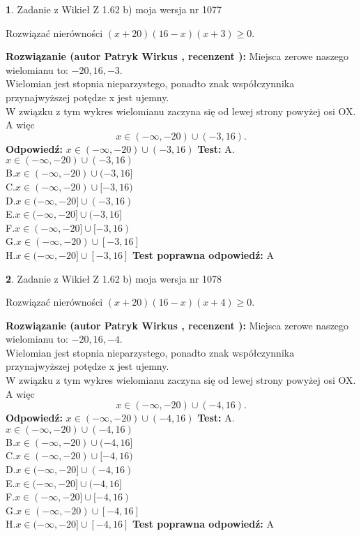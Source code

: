 \documentclass[12pt, a4paper]{article}
\theoremstyle{definition} %
\newtheorem{zad}{}
\newcommand{\zadStart}[1]{\begin{zad}#1\newline}
\newcommand{\zadStop}{\end{zad}}
\newcommand{\rozwStart}[2]{\noindent \textbf{Rozwiązanie (autor #1 , recenzent #2): }\newline}
\newcommand{\rozwStop}{\newline}
\newcommand{\odpStart}{\noindent \textbf{Odpowiedź:}\newline}
\newcommand{\odpStop}{\newline}
\newcommand{\testStart}{\noindent \textbf{Test:}\newline}
\newcommand{\testStop}{\newline}
\newcommand{\kluczStart}{\noindent \textbf{Test poprawna odpowiedź:}\newline}
\newcommand{\kluczStop}{\newline}
\begin{document}
\zadStart{Zadanie z Wikieł Z 1.62 b) moja wersja nr 1077}

Rozwiązać nierówności $(x+20)(16-x)(x+3)\ge0$.
\zadStop
\rozwStart{Patryk Wirkus}{}
Miejsca zerowe naszego wielomianu to: $-20, 16, -3$.\\
Wielomian jest stopnia nieparzystego, ponadto znak współczynnika przy\linebreak najwyższej potędze x jest ujemny.\\ W związku z tym wykres wielomianu zaczyna się od lewej strony powyżej osi OX. A więc $$x \in (-\infty,-20) \cup (-3,16).$$
\rozwStop
\odpStart
$x \in (-\infty,-20) \cup (-3,16)$
\odpStop
\testStart
A.$x \in (-\infty,-20) \cup (-3,16)$\\
B.$x \in (-\infty,-20) \cup (-3,16]$\\
C.$x \in (-\infty,-20) \cup [-3,16)$\\
D.$x \in (-\infty,-20] \cup (-3,16)$\\
E.$x \in (-\infty,-20] \cup (-3,16]$\\
F.$x \in (-\infty,-20] \cup [-3,16)$\\
G.$x \in (-\infty,-20) \cup [-3,16]$\\
H.$x \in (-\infty,-20] \cup [-3,16]$
\testStop
\kluczStart
A
\kluczStop



\zadStart{Zadanie z Wikieł Z 1.62 b) moja wersja nr 1078}

Rozwiązać nierówności $(x+20)(16-x)(x+4)\ge0$.
\zadStop
\rozwStart{Patryk Wirkus}{}
Miejsca zerowe naszego wielomianu to: $-20, 16, -4$.\\
Wielomian jest stopnia nieparzystego, ponadto znak współczynnika przy\linebreak najwyższej potędze x jest ujemny.\\ W związku z tym wykres wielomianu zaczyna się od lewej strony powyżej osi OX. A więc $$x \in (-\infty,-20) \cup (-4,16).$$
\rozwStop
\odpStart
$x \in (-\infty,-20) \cup (-4,16)$
\odpStop
\testStart
A.$x \in (-\infty,-20) \cup (-4,16)$\\
B.$x \in (-\infty,-20) \cup (-4,16]$\\
C.$x \in (-\infty,-20) \cup [-4,16)$\\
D.$x \in (-\infty,-20] \cup (-4,16)$\\
E.$x \in (-\infty,-20] \cup (-4,16]$\\
F.$x \in (-\infty,-20] \cup [-4,16)$\\
G.$x \in (-\infty,-20) \cup [-4,16]$\\
H.$x \in (-\infty,-20] \cup [-4,16]$
\testStop
\kluczStart
A
\kluczStop
\end{document}
